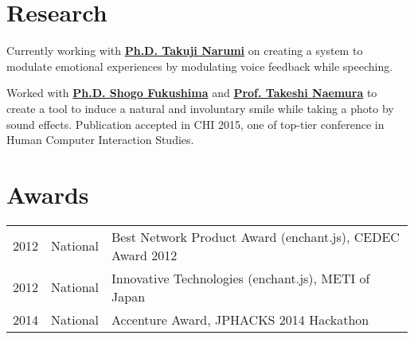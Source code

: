 \documentclass[letterpaper]{deedy-resume} %
\begin{document}
\begin{minipage}[t]{0.66\textwidth}

\section{Research}

Currently working with \textbf{\href{http://www.cyber.t.u-tokyo.ac.jp/~narumi/}{Ph.D. Takuji Narumi}} on creating a system to modulate emotional experiences by modulating voice feedback while speeching.

\vspace{2mm} %


Worked with \textbf{\href{http://shogofukushima.com/}{Ph.D. Shogo Fukushima}} and \textbf{\href{http://nae-lab.org/~naemura/}{Prof. Takeshi Naemura}} to create a tool to induce a natural and involuntary smile while taking a photo by sound effects. Publication accepted in CHI 2015, one of top-tier conference in Human Computer Interaction Studies.

\vspace{2mm} %


\section{Awards}

\begin{tabular}{rll}
2012 & National & Best Network Product Award (enchant.js), CEDEC Award 2012\\
2012 & National & Innovative Technologies (enchant.js), METI of Japan\\
2014 & National & Accenture Award, JPHACKS 2014 Hackathon\\
\end{tabular}

\sectionspace %


\end{minipage} %
\end{document}
